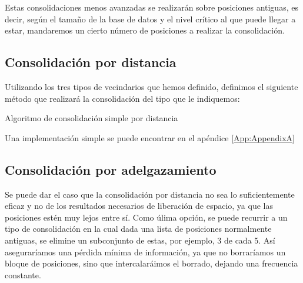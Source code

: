 \documentclass[a4paper, 12pt, spanish]{article}
\begin{document}
Estas consolidaciones menos avanzadas se realizar\'an sobre posiciones antiguas, es decir, seg\'un el tama\~no de la base de datos y el nivel cr\'itico al que puede llegar a estar, mandaremos un cierto n\'umero de posiciones a realizar la consolidaci\'on. \\


\pagebreak
\subsection{Consolidaci\'on por distancia}

Utilizando los tres tipos de vecindarios que hemos definido, definimos el siguiente m\'etodo que realizar\'a la consolidaci\'on del tipo que le indiquemos:\\


\begin{algorithm}[h]\label{consolidationByDistance}
\begin{algorithmic}[1]
        \Else
        \EndIf
    \EndIf
        \Else
        \EndIf
    \EndIf
        \Else
        \EndIf
    \EndIf
\EndFor
\EndFunction
\end{algorithmic}
\caption{\label{alg:consolidationByDinstace} Algoritmo de consolidaci\'on simple por distancia}
\end{algorithm}

Una implementaci\'on simple se puede encontrar en el ap\'endice \ref{App:AppendixA}
\pagebreak
\subsection{Consolidaci\'on por adelgazamiento}

Se puede dar el caso que la consolidaci\'on por distancia no sea lo suficientemente eficaz y no de los resultados necesarios de liberaci\'on de espacio, ya que las posiciones est\'en muy lejos entre s\'i. Como \'ulima opci\'on, se puede recurrir a un tipo de consolidaci\'on en la cual dada una lista de posiciones normalmente antiguas, se elimine un subconjunto de estas, por ejemplo, 3 de cada 5. As\'i asegurar\'iamos una p\'erdida m\'inima de informaci\'on, ya que no borrar\'iamos un bloque de posiciones, sino que intercalar\'aimos el borrado, dejando una frecuencia constante. \\
\end{document}

